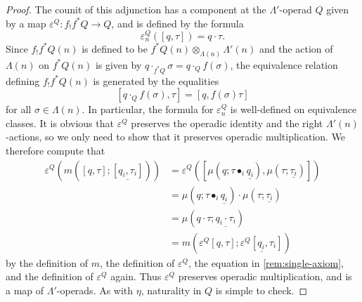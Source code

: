 \begin{proof}
The counit of this adjunction has a component at the $\Lambda'$-operad $Q$ given by a map $\varepsilon^Q \colon f_{!}f^*Q \to Q$, and is defined by the formula
\[
\varepsilon^Q_n\left( [q,\tau] \right) = q \cdot \tau.
\]
Since $f_{!}f^*Q(n)$ is defined to be $f^*Q(n) \otimes_{\Lambda(n)} \Lambda'(n)$ and the action of $\Lambda(n)$ on  $f^*Q(n)$ is given by $q \cdot_{f^*Q} \sigma = q \cdot_{Q} f(\sigma)$, the equivalence relation defining $f_!f^*Q(n)$ is generated by the equalities
\[
[q \cdot_{Q} f(\sigma), \tau] = [q, f(\sigma)\tau]
\]
for all $\sigma \in \Lambda(n)$. In particular, the formula for $\varepsilon^Q_n$ is well-defined on equivalence classes. It is obvious that $\varepsilon^Q$ preserves the operadic identity and the right $\Lambda'(n)$-actions, so we only need to show that it preserves operadic multiplication. We therefore compute that
\begin{align*}
\varepsilon^Q \left( m\left( [q, \tau]; \underline{ [q_i, \tau_i] } \right) \right) & = \varepsilon^Q\left( [\mu(q; \tau \bullet_i \underline{q_i}), \mu(\tau; \underline{\tau_i}) ] \right) \\
& = \mu(q; \tau \bullet_i \underline{q_i}) \cdot \mu(\tau; \underline{\tau_i}) \\
& = \mu(q \cdot \tau; \underline{q_i \cdot \tau_i}) \\
& = m\left( \varepsilon^Q[q,\tau]; \underline{\varepsilon^Q[q_i, \tau_i]}\right)
\end{align*}
by the definition of $m$, the definition of $\varepsilon^Q$, the equation in \cref{rem:single-axiom}, and the definition of $\varepsilon^Q$ again.
Thus $\varepsilon^Q$ preserves operadic multiplication, and is a map of $\Lambda'$-operads. As with $\eta$, naturality in $Q$ is simple to check.


\end{proof}

